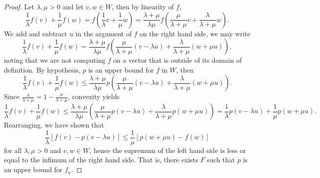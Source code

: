\begin{proof}
    Let \(\lambda, \mu > 0\) and let \(v, w \in W\), then by linearity of \(f\),
    \begin{equation*}
        \frac{1}{\lambda} f(v) + \frac{1}{\mu}f(w) = f\left(\frac{1}{\lambda}v + \frac{1}{\mu}{w}\right) = \frac{\lambda + \mu}{\lambda \mu} f\left(\frac{\mu}{\lambda + \mu}v + \frac{\lambda}{\lambda + \mu}w\right).
    \end{equation*}
    We add and subtract \(u\) in the argument of \(f\) on the right hand side, we may write
    \begin{equation*}
        \frac{1}{\lambda} f(v) + \frac{1}{\mu}f(w) = \frac{\lambda + \mu}{\lambda \mu} f\left(\frac{\mu}{\lambda + \mu}(v - \lambda u) + \frac{\lambda}{\lambda + \mu}(w + \mu u)\right),
    \end{equation*}
    noting that we are not computing \(f\) on a vector that is outside of its domain of definition. By hypothesis, \(p\) is an upper bound for \(f\) in \(W\), then
    \begin{equation*}
        \frac{1}{\lambda}f(v) + \frac{1}{\mu}f(w) \leq \frac{\lambda + \mu}{\lambda \mu} p\left(\frac{\mu}{\lambda + \mu}(v - \lambda u) + \frac{\lambda}{\lambda + \mu}(w + \mu u)\right).
    \end{equation*}
    Since \(\frac{\lambda}{\lambda + \mu} = 1 - \frac{\mu}{\lambda + \mu}\), convexity yields
    \begin{equation*}
        \frac1{\lambda}f(v) + \frac1{\mu}f(w) \leq \frac{\lambda + \mu}{\lambda \mu} \left(\frac{\mu}{\lambda + \mu} p(v - \lambda u) + \frac{\lambda}{\lambda + \mu} p(w + \mu u)\right) = \frac{1}{\lambda}p(v - \lambda u) + \frac{1}{\mu}p(w + \mu u).
    \end{equation*}
    Rearranging, we have shown that
    \begin{equation*}
        \frac{1}{\lambda} \left[f(v) - p(v - \lambda u)\right] \leq \frac{1}{\mu} \left[p(w + \mu u) - f(w)\right]
    \end{equation*}
    for all \(\lambda, \mu > 0\) and \(v,w \in W\), hence the supremum of the left hand side is less or equal to the infimum of the right hand side. That is, there exists \(F\) such that \(p\) is an upper bound for \(f_u\).
\end{proof}

